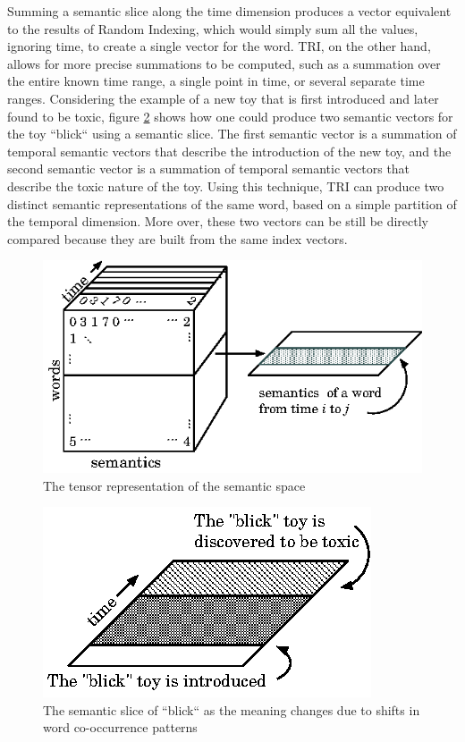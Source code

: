 \documentclass[a4paper,twocolumn,twoside,10pt]{ranlp}
\begin{document}
Summing a semantic slice along the time dimension produces a vector equivalent
to the results of Random Indexing, which would simply sum all the values,
ignoring time, to create a single vector for the word.  TRI, on the other hand,
allows for more precise summations to be computed, such as a summation over the
entire known time range, a single point in time, or several separate time
ranges.  Considering the example of a new toy that is first introduced and
later found to be toxic, figure \ref{fig:temporal-semantics} shows how one could
produce two semantic vectors for the toy ``blick`` using a semantic slice.  The
first semantic vector is a summation of temporal semantic vectors that describe
the introduction of the new toy, and the second semantic vector is a summation
of temporal semantic vectors that describe the toxic nature of the toy.  Using
this technique, TRI can produce two distinct semantic representations of the
same word, based on a simple partition of the temporal dimension.  More over,
these two vectors can be still be directly compared because they are built from
the same index vectors.

\begin{figure} \center
\includegraphics[width=.49\textwidth]{figures/time-tensor.eps} 
\caption{The tensor representation of the semantic space} 
\label{fig:tensor-space}
\end{figure}

\begin{figure} \center
\includegraphics[]{figures/blick-semantic-slice.eps}
\caption{The semantic slice of ``blick`` as the meaning changes due to shifts in
  word co-occurrence patterns}
\label{fig:temporal-semantics}
\end{figure}
\end{document}
